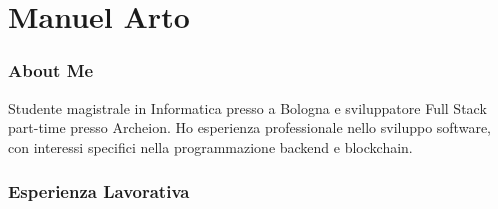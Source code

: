 \documentclass{tccv}
\begin{document}
\part{Manuel Arto}

\section{About Me}

Studente magistrale in Informatica presso a Bologna e sviluppatore Full Stack part-time presso Archeion.\newline
Ho esperienza professionale nello sviluppo software, con interessi specifici nella programmazione backend e blockchain.

\section{Esperienza Lavorativa}
\end{document}
